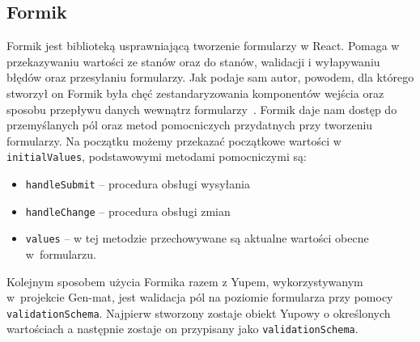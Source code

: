 \documentclass[oneside,polski,logo,indent]{amuthesis}
\begin{document}
\subsection{Formik}
Formik jest biblioteką usprawniającą tworzenie formularzy w React. Pomaga w przekazywaniu wartości ze stanów oraz do stanów, walidacji i wyłapywaniu błędów oraz przesyłaniu formularzy.
Jak podaje sam autor, powodem, dla którego stworzył on Formik była chęć zestandaryzowania komponentów wejścia oraz sposobu przepływu danych wewnątrz formularzy~\cite{formik}.
Formik daje nam dostęp do przemyślanych pól oraz metod pomocniczych przydatnych przy tworzeniu formularzy. Na początku możemy przekazać początkowe wartości w \texttt{initialValues}, podstawowymi metodami pomocniczymi są:
\begin{itemize}
\item \texttt{handleSubmit} -- procedura obsługi wysyłania
\item \texttt{handleChange} -- procedura obsługi zmian
\item \texttt{values} -- w tej metodzie przechowywane są aktualne wartości obecne w~formularzu.
\end{itemize}
Kolejnym sposobem użycia Formika razem z Yupem, wykorzystywanym w~projekcie Gen-mat, jest walidacja pól na poziomie formularza przy pomocy \texttt{validationSchema}. 
Najpierw stworzony zostaje obiekt Yupowy o określonych wartościach a następnie zostaje on przypisany jako \texttt{validationSchema}.
\end{document}
